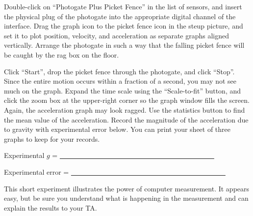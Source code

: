 Double-click on ``Photogate Plus Picket Fence'' in the list of sensors, and insert the physical plug of the photogate into the appropriate digital channel of the interface.  Drag the graph icon to the picket fence icon in the steup picture, and set it to plot position, velocity, and acceleration as separate graphs aligned vertically.  Arrange the photogate in such a way that the falling picket fence will be caught by the rag box on the floor.

Click ``Start'', drop the picket fence through the photogate, and click ``Stop''.  Since the entire motion occurs within a fraction of a second, you may not see much on the graph.  Expand the time scale using the ``Scale-to-fit'' button, and click the zoom box at the upper-right corner so the graph window fills the screen.  Again, the acceleration graph may look ragged.  Use the statistics button to find the mean value of the acceleration.  Record the magnitude of the acceleration due to gravity with experimental error below.  You can print your sheet of three graphs to keep for your records.

Experimental \(g\) = \ul{~~~~~~~~~~~~~~~~~~~~~~~~~~~~~~~~~~~~~~~~~~~~~}

Experimental error = \ul{~~~~~~~~~~~~~~~~~~~~~~~~~~~~~~~~~~~~~~~~~~~~~}

This short experiment illustrates the power of computer measurement.  It appears easy, but be sure you understand what is happening in the measurement and can explain the results to your TA.
